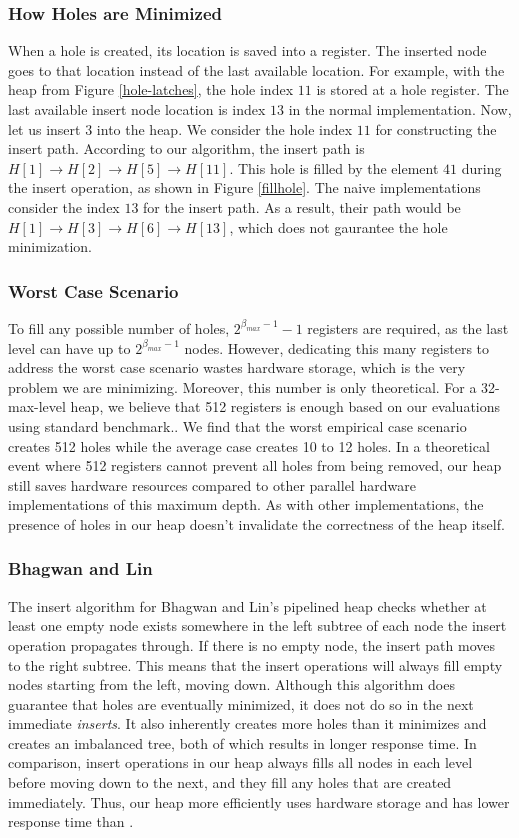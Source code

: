 \subsubsection{How Holes are Minimized} 
When a hole is created, its location is saved into a register. 
The inserted node goes to that location instead of the last available location. 
For example, with the heap from Figure \ref{hole-latches}, the hole index $11$ is stored at a hole register. 
The last available insert node location is index $13$ in the normal implementation. 
Now, let us insert $3$ into the heap. 
We consider the hole index $11$ for constructing the insert path. 
According to our algorithm, the insert path is $H[1] \rightarrow H[2] \rightarrow H[5] \rightarrow H[11]$. 
This hole is filled by the element $41$ during the insert operation, as shown in Figure \ref{fillhole}. 
The naive implementations consider the index $13$ for the insert path.
As a result, their path would be $H[1] \rightarrow H[3] \rightarrow H[6] \rightarrow H[13]$, which does not gaurantee the hole minimization.


\subsubsection{Worst Case Scenario}
To fill any possible number of holes, $2^{\beta_{max}-1} - 1$ registers are required, as the last level can have up to $2^{\beta_{max}-1}$ nodes. 
However, dedicating this many registers to address the worst case scenario wastes hardware storage, which is the very problem we are minimizing. 
Moreover, this number is only theoretical.
For a 32-max-level heap, we believe that 512 registers is enough based on our evaluations using standard benchmark..
We find that the worst empirical case scenario creates 512 holes while the average case creates 10 to 12 holes.
In a theoretical event where 512 registers cannot prevent all holes from being removed, our heap still saves hardware resources compared to other parallel hardware implementations of this maximum depth. 
As with other implementations, the presence of holes in our heap doesn't invalidate the correctness of the heap itself.

\subsubsection{Bhagwan and Lin}
The insert algorithm for Bhagwan and Lin's pipelined heap \cite{hw2} checks whether at least one empty node exists somewhere in the left subtree of each node the insert operation propagates through. If there is no empty node, the insert path moves to the right subtree. This means that the insert operations will always fill empty nodes starting from the left, moving down. Although this algorithm does guarantee that holes are eventually minimized, it does not do so in the next immediate {\it inserts}. It also inherently creates more holes than it minimizes and creates an imbalanced tree, both of which results in longer response time. In comparison, insert operations in our heap always fills all nodes in each level before moving down to the next, and they fill any holes that are created immediately. Thus, our heap more efficiently uses hardware storage and has lower response time than \cite{hw2}.